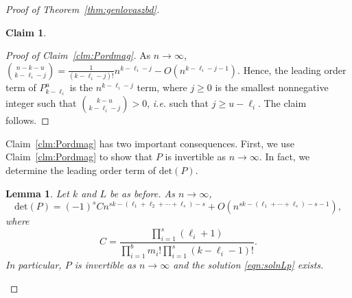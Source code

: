\documentclass[11pt]{article}
\newtheorem{lemma}[theorem]{Lemma}
\newtheorem{claim}[theorem]{Claim}
\theoremstyle{definition}
\theoremstyle{remark}
\begin{document}
\begin{proof}[Proof of Theorem~\ref{thm:genlovaszbd}]
\begin{claim}
\end{claim}
\begin{proof}[Proof of Claim~\ref{clm:Pordmag}]
As $n\rightarrow \infty$, $\binom{n-k-u}{k-\ell_i - j} = \frac{1}{(k-\ell_i-j)!}n^{k-\ell_i-j} - O(n^{k-\ell_i-j-1})$.  Hence, the leading order term of $P_{k-\ell_i}^u$ is the $n^{k-\ell_i-j}$ term, where $j \ge 0$ is the smallest nonnegative integer such that $\binom{k-u}{k-\ell_i - j} > 0$, \textit{i.e.} such that $j \ge u-\ell_i$. The claim follows.
 \end{proof}


Claim~\ref{clm:Pordmag} has two important consequences. First, we use Claim~\ref{clm:Pordmag} to show that $P$ is invertible as $n\rightarrow \infty$. In fact, we determine the leading order term of $\text{det}(P)$. 

\begin{lemma}\label{detPs}
Let $k$ and $L$ be  as before. As $n\rightarrow \infty$, 
\[\text{det}(P) = (-1)^{s}Cn^{sk-(\ell_1+\ell_2+\cdots + \ell_s)-s} + O(n^{sk-(\ell_1+\cdots+\ell_s)-s-1}),\]
where
\[C =  \frac{\prod_{i=1}^s(\ell_i+1)}{ \prod_{i=1}^bm_i!  \prod_{i=1}^s(k-\ell_i-1)!}.\]
In particular, $P$ is invertible as $n\rightarrow \infty$ and the solution \eqref{eqn:solnLp} exists.
\end{lemma}


\end{proof}
\end{document}
